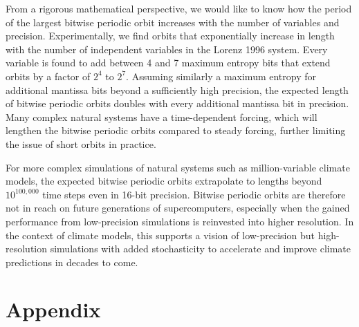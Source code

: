 From a rigorous mathematical perspective, we would like to know how the period of the largest bitwise periodic orbit increases
with the number of variables and precision. Experimentally, we find orbits that exponentially increase in length with the number
of independent variables in the Lorenz 1996 system. Every variable is found to add between 4 and 7 maximum entropy bits that
extend orbits by a factor of $2^4$ to $2^7$. Assuming similarly a maximum entropy for additional mantissa bits beyond a
sufficiently high precision, the expected length of bitwise periodic orbits doubles with every additional mantissa bit in precision.
Many complex natural systems have a time-dependent forcing, which will lengthen the bitwise periodic orbits compared to
steady forcing, further limiting the issue of short orbits in practice.

For more complex simulations of natural systems such as million-variable climate models, the expected bitwise periodic orbits
extrapolate to lengths beyond $10^{100,000}$ time steps even in 16-bit precision. Bitwise periodic orbits are therefore not in reach
on future generations of supercomputers, especially when the gained performance from low-precision simulations is reinvested
into higher resolution. In the context of climate models, this supports a vision of low-precision but high-resolution simulations
with added stochasticity to accelerate and improve climate predictions in decades to come.

\newpage
\section{Appendix}
\label{sec:orbits_appendix}

